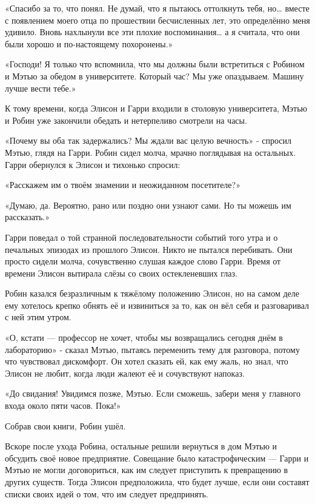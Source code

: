 \documentclass[a4paper,12pt]{book}
\begin{document}
\par
«Спасибо за то, что понял. Не думай, что я пытаюсь оттолкнуть тебя, но… вместе с появлением моего отца по прошествии бесчисленных лет, это определённо меня удивило. Вновь нахлынули все эти плохие воспоминания… а я считала, что они были хорошо и по-настоящему похоронены.»
\par
«Господи! Я только что вспомнила, что мы должны были встретиться с Робином и Мэтью за обедом в университете. Который час? Мы уже опаздываем. Машину лучше вести тебе.»\\
\par
К тому времени, когда Элисон и Гарри входили в столовую университета, Мэтью и Робин уже закончили обедать и нетерпеливо смотрели на часы.
\par
«Почему вы оба так задержались? Мы ждали вас целую вечность» - спросил Мэтью, глядя на Гарри. Робин сидел молча, мрачно поглядывая на остальных. Гарри обернулся к Элисон и тихонько спросил:
\par
«Расскажем им о твоём знамении и неожиданном посетителе?»
\par
«Думаю, да. Вероятно, рано или поздно они узнают сами. Но ты можешь им рассказать.»
\par
Гарри поведал о той странной последовательности событий того утра и о печальных эпизодах из прошлого Элисон. Никто не пытался перебивать. Они просто сидели молча, сочувственно слушая каждое слово Гарри. Время от времени Элисон вытирала слёзы со своих остекленевших глаз.
\par
Робин казался безразличным к тяжёлому положению Элисон, но на самом деле ему хотелось крепко обнять её и извиниться за то, как он вёл себя и разговаривал с ней этим утром.
\par
«О, кстати — профессор не хочет, чтобы мы возвращались сегодня днём в лабораторию» - сказал Мэтью, пытаясь переменить тему для разговора, потому что чувствовал дискомфорт. Он хотел сказать ей, как ему жаль, но знал, что Элисон не любит, когда люди жалеют её и сочувствуют напоказ.
\par
«До свидания! Увидимся позже, Мэтью. Если сможешь, забери меня у главного входа около пяти часов. Пока!»
\par
Собрав свои книги, Робин ушёл.\\
\par
Вскоре после ухода Робина, остальные решили вернуться в дом Мэтью и обсудить своё новое предприятие. Совещание было катастрофическим — Гарри и Мэтью не могли договориться, как им следует приступить к превращению в других существ. Тогда Элисон предположила, что будет лучше, если они составят списки своих идей о том, что им следует предпринять.
\end{document}
